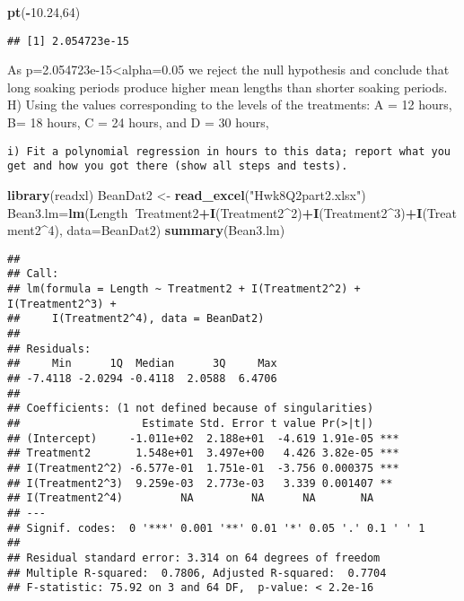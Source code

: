 \documentclass[]{article}
\newenvironment{Shaded}{\begin{snugshade}}{\end{snugshade}}
\newcommand{\KeywordTok}[1]{\textcolor[rgb]{0.13,0.29,0.53}{\textbf{#1}}}
\newcommand{\DataTypeTok}[1]{\textcolor[rgb]{0.13,0.29,0.53}{#1}}
\newcommand{\DecValTok}[1]{\textcolor[rgb]{0.00,0.00,0.81}{#1}}
\newcommand{\FloatTok}[1]{\textcolor[rgb]{0.00,0.00,0.81}{#1}}
\newcommand{\StringTok}[1]{\textcolor[rgb]{0.31,0.60,0.02}{#1}}
\newcommand{\OperatorTok}[1]{\textcolor[rgb]{0.81,0.36,0.00}{\textbf{#1}}}
\newcommand{\NormalTok}[1]{#1}
\begin{document}
\begin{Shaded}
\begin{Highlighting}[]
\KeywordTok{pt}\NormalTok{(}\OperatorTok{-}\FloatTok{10.24}\NormalTok{,}\DecValTok{64}\NormalTok{)}
\end{Highlighting}
\end{Shaded}

\begin{verbatim}
## [1] 2.054723e-15
\end{verbatim}

As p=2.054723e-15\textless{}alpha=0.05 we reject the null hypothesis and
conclude that long soaking periods produce higher mean lengths than
shorter soaking periods. H) Using the values corresponding to the levels
of the treatments: A = 12 hours, B= 18 hours, C = 24 hours, and D = 30
hours,

\begin{verbatim}
i) Fit a polynomial regression in hours to this data; report what you get and how you got there (show all steps and tests).
\end{verbatim}

\begin{Shaded}
\begin{Highlighting}[]
\KeywordTok{library}\NormalTok{(readxl)}
\NormalTok{BeanDat2 <-}\StringTok{ }\KeywordTok{read_excel}\NormalTok{(}\StringTok{"Hwk8Q2part2.xlsx"}\NormalTok{)}
\NormalTok{Bean3.lm=}\KeywordTok{lm}\NormalTok{(Length}\OperatorTok{~}\NormalTok{Treatment2}\OperatorTok{+}\KeywordTok{I}\NormalTok{(Treatment2}\OperatorTok{^}\DecValTok{2}\NormalTok{)}\OperatorTok{+}\KeywordTok{I}\NormalTok{(Treatment2}\OperatorTok{^}\DecValTok{3}\NormalTok{)}\OperatorTok{+}\KeywordTok{I}\NormalTok{(Treatment2}\OperatorTok{^}\DecValTok{4}\NormalTok{), }\DataTypeTok{data=}\NormalTok{BeanDat2)}
\KeywordTok{summary}\NormalTok{(Bean3.lm)}
\end{Highlighting}
\end{Shaded}

\begin{verbatim}
## 
## Call:
## lm(formula = Length ~ Treatment2 + I(Treatment2^2) + I(Treatment2^3) + 
##     I(Treatment2^4), data = BeanDat2)
## 
## Residuals:
##     Min      1Q  Median      3Q     Max 
## -7.4118 -2.0294 -0.4118  2.0588  6.4706 
## 
## Coefficients: (1 not defined because of singularities)
##                   Estimate Std. Error t value Pr(>|t|)    
## (Intercept)     -1.011e+02  2.188e+01  -4.619 1.91e-05 ***
## Treatment2       1.548e+01  3.497e+00   4.426 3.82e-05 ***
## I(Treatment2^2) -6.577e-01  1.751e-01  -3.756 0.000375 ***
## I(Treatment2^3)  9.259e-03  2.773e-03   3.339 0.001407 ** 
## I(Treatment2^4)         NA         NA      NA       NA    
## ---
## Signif. codes:  0 '***' 0.001 '**' 0.01 '*' 0.05 '.' 0.1 ' ' 1
## 
## Residual standard error: 3.314 on 64 degrees of freedom
## Multiple R-squared:  0.7806, Adjusted R-squared:  0.7704 
## F-statistic: 75.92 on 3 and 64 DF,  p-value: < 2.2e-16
\end{verbatim}
\end{document}
